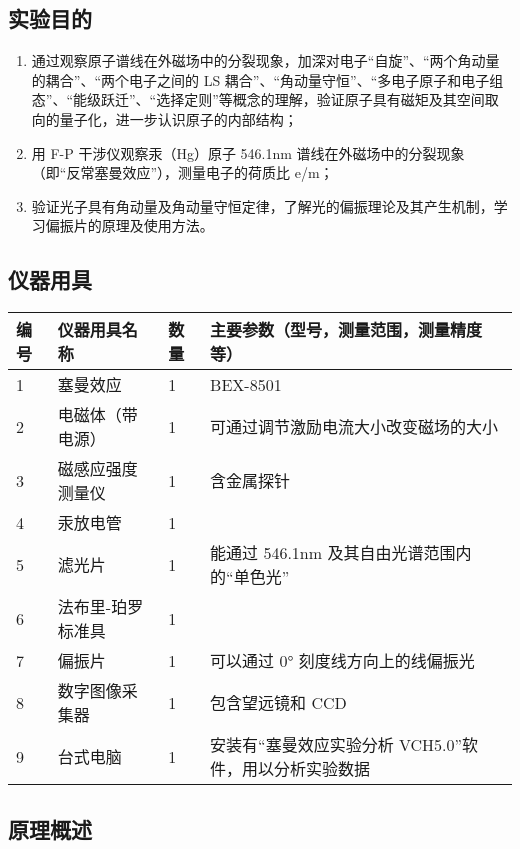 \documentclass[dvipsnames, svgnames,a4paper,11pt]{article}
\begin{document}
\subsection{实验目的}

	\begin{enumerate}
		\item 通过观察原子谱线在外磁场中的分裂现象，加深对电子“自旋”、“两个角动量的耦合”、“两个电子之间的 LS 耦合”、“角动量守恒”、“多电子原子和电子组态”、“能级跃迁”、“选择定则”等概念的理解，验证原子具有磁矩及其空间取向的量子化，进一步认识原子的内部结构；
		\item 用 F-P 干涉仪观察汞（Hg）原子 546.1nm 谱线在外磁场中的分裂现象（即“反常塞曼效应”），测量电子的荷质比 e/m；
		\item 验证光子具有角动量及角动量守恒定律，了解光的偏振理论及其产生机制，学习偏振片的原理及使用方法。
	\end{enumerate}

\subsection{仪器用具}
\begin{table}[htbp]
    \centering
    \renewcommand\arraystretch{1.6}
    \begin{tabular}{p{}|p{}|p{}|p{}}
        \hline
        编号 & 仪器用具名称 & 数量 & 主要参数（型号，测量范围，测量精度等） \\
        \hline
        1 & 塞曼效应 & 1 & BEX-8501 \\
        2 & 电磁体（带电源） & 1 & 可通过调节激励电流大小改变磁场的大小 \\
        3 & 磁感应强度测量仪 & 1 & 含金属探针 \\
        4 & 汞放电管 & 1 & \\
        5 & 滤光片 & 1 & 能通过 546.1nm 及其自由光谱范围内的“单色光” \\
        6 & 法布里-珀罗标准具 & 1 &  \\
        7 & 偏振片 & 1 & 可以通过 0° 刻度线方向上的线偏振光\\
        8 & 数字图像采集器 & 1 & 包含望远镜和 CCD \\
        9 & 台式电脑 & 1 & 安装有“塞曼效应实验分析 VCH5.0”软件，用以分析实验数据 \\
        \hline
    \end{tabular}
\end{table}

\subsection{原理概述}
\end{document}
